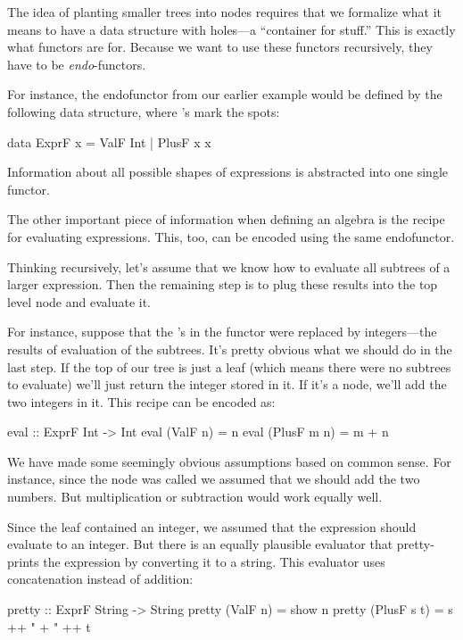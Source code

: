 \documentclass[DaoFP]{subfiles}
\begin{document}
The idea of planting smaller trees into nodes requires that we formalize what it means to have a data structure with holes---a ``container for stuff.'' This is exactly what functors are for. Because we want to use these functors recursively, they have to be \emph{endo}-functors.

For instance, the endofunctor from our earlier example would be defined by the following data structure, where 's mark the spots:
\begin{haskell}
data ExprF x = ValF Int 
             | PlusF x x
\end{haskell}
Information about all possible shapes of expressions is abstracted into one single functor. 

The other important piece of information when defining an algebra is the recipe for evaluating expressions. This, too, can be encoded using the same endofunctor. 

Thinking recursively, let's assume that we know how to evaluate all subtrees of a larger expression. Then the remaining step is to plug these results into the top level node and evaluate it. 

For instance, suppose that the 's in the functor were replaced by integers---the results of evaluation of the subtrees. It's pretty obvious what we should do in the last step. If the top of our tree is just a leaf  (which means there were no subtrees to evaluate) we'll just return the integer stored in it. If it's a  node, we'll add the two integers in it. This recipe can be encoded as:
\begin{haskell}
eval :: ExprF Int -> Int
eval (ValF n)    = n
eval (PlusF m n) = m + n
\end{haskell}

We have made some seemingly obvious assumptions based on common sense. For instance, since the node was called  we assumed that we should add the two numbers. But multiplication or subtraction would work equally well.

Since the leaf  contained an integer, we assumed that the expression should evaluate to an integer. But there is an equally plausible evaluator that pretty-prints the expression by converting it to a string. This evaluator uses concatenation instead of addition:
\begin{haskell}
pretty :: ExprF String -> String
pretty (ValF n)    = show n
pretty (PlusF s t) = s ++ " + " ++ t
\end{haskell}
\end{document}
